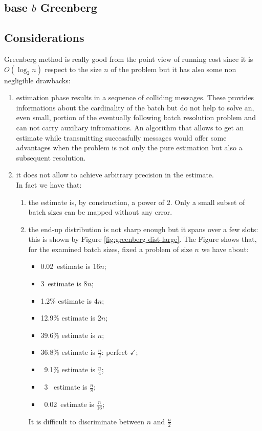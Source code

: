 \documentclass[12pt,a4paper]{report}
\begin{document}
\subsection{base $b$ Greenberg}
\subsection{Considerations}
Greenberg method is really good from the point view of running cost since it is $O(\log_{2}n)$ respect to the size  $n$ of the problem but it has also some non negligible drawbacks:
\begin{enumerate}[\bf a)]
\item estimation phase results in a sequence of colliding messages. These provides informations about the cardinality of the batch but do not help to solve an, even small, portion of the eventually following batch resolution problem and can not carry auxiliary infromations. An algorithm that allows to get an estimate while transmitting successfully messages would offer some advantages when the problem is not only the pure estimation but also a subsequent resolution.
\item it does not allow to achieve arbitrary precision in the estimate.\\ In fact we have that:
	\begin{enumerate}[\it i.]
		\item  the estimate is, by construction, a power of 2. Only a small subset of batch sizes can be mapped without any error.
		\item the end-up distribution is not sharp enough but it spans over a few slots: this is shown by Figure \ref{fig:greenberg-dist-large}. The Figure shows that, for the examined batch sizes, fixed a problem of size $n$ we have about:
		\begin{itemize}
		\item 0.02\textpertenthousand\  estimate is $16n$;
		\item 3\textpertenthousand\  estimate is $8n$;
		\item 1.2\% estimate is $4n$;
		\item 12.9\% estimate is $2n$;
		\item 39.6\% estimate is $n$;
		\item 36.8\% estimate is $\frac{n}{2}$: perfect $\checkmark$;
		\item \ 9.1\% estimate is $\frac{n}{4}$;
		\item \  3 \textperthousand\ estimate is $\frac{n}{8}$;
		\item \ 0.02\textpertenthousand\ estimate is $\frac{n}{16}$;
		\end{itemize}
		It is difficult to discriminate between $n$ and $\frac{n}{2}$ 
	\end{enumerate}
\end{enumerate}
\end{document}
